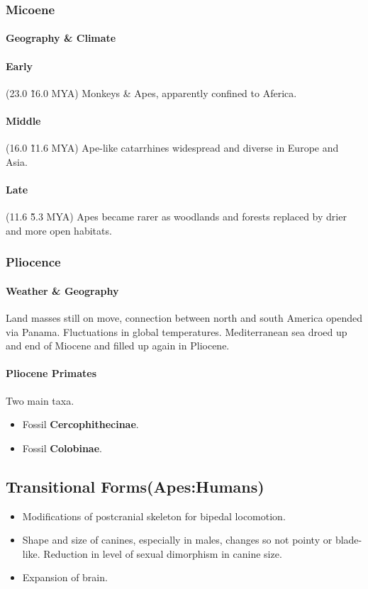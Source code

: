 \documentclass{article}
\begin{document}
\subsubsection{Micoene}
	\paragraph{Geography \& Climate}
	\paragraph{Early} (23.0 \~ 16.0 MYA) Monkeys \& Apes, apparently confined to Aferica.
	\paragraph{Middle} (16.0 \~ 11.6 MYA) Ape-like catarrhines widespread and diverse in Europe and Asia.
	\paragraph{Late} (11.6 \~ 5.3 MYA) Apes became rarer as woodlands and forests replaced by drier and more open habitats.
\subsubsection{Pliocence}
	\paragraph{Weather \& Geography} Land masses still on move, connection between north and south America opended via Panama.
	\newline Fluctuations in global temperatures.
	\newline Mediterranean sea droed up and end of Miocene and filled up again in Pliocene.
	\paragraph{Pliocene Primates} Two main taxa.
	\begin{itemize}
		\item Fossil \textbf{Cercophithecinae}.
		\item Fossil \textbf{Colobinae}.
	\end{itemize}

\subsection{Transitional Forms(Apes:Humans)}
\begin{itemize}
	\item Modifications of postcranial skeleton for bipedal locomotion.
	\item Shape and size of canines, especially in males, changes so not pointy or blade-like. Reduction in level of sexual dimorphism in canine size.
	\item Expansion of brain.
\end{itemize}
\end{document}
